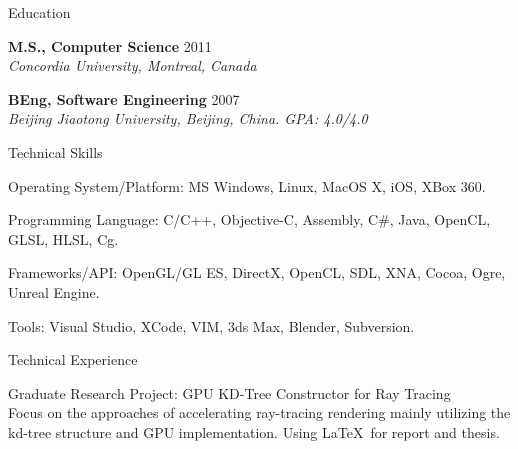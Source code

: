 \documentclass[10pt]{article}
\newenvironment{mydescription}{%
    \begin{description}
        \setlength{\itemsep}{0.25em}%
        \setlength{\parsep}{0em}%
        \setlength{\topsep}{\itemsep}%
        \setlength{\parskip}{0em}%
        \setlength{\labelwidth}{0.1em}
        \setlength{\labelsep}{0em} 
    }%
{\end{description}}
\begin{document}
\begin{cv}
\begin{cvlist}{Education}
    
    \item   \textbf{M.S., Computer Science} \hfill 2011 \\ 
            \emph{Concordia University, Montreal, Canada}
    \item   \textbf{BEng, Software Engineering} \hfill 2007 \\
            \emph{Beijing Jiaotong University, Beijing, China. GPA: 4.0/4.0}
\end{cvlist}

\begin{cvlist}{Technical Skills}
\item
    \begin{mydescription} 
        \item Operating System/Platform: \hspace{0.1em} 
            MS Windows, Linux, MacOS X, iOS, XBox 360.
        \item Programming Language: \hspace{0.1em} 
            C/C++, Objective-C, Assembly, C\#, Java, OpenCL, GLSL, HLSL, Cg.
        \item Frameworks/API: \hspace{0.1em} 
            OpenGL/GL ES, DirectX, OpenCL, SDL, XNA, Cocoa, Ogre, Unreal Engine.  
        \item Tools: \hspace{0.1em} 
            Visual Studio, XCode, VIM, 3ds Max, Blender, Subversion.
    \end{mydescription} 
\end{cvlist} 


\begin{cvlist}{Technical Experience}
\item
    \begin{mydescription}
        \item[Graduate Research Project: GPU KD-Tree Constructor for Ray Tracing] \hfill \\
            Focus on the approaches of accelerating ray-tracing rendering mainly utilizing the kd-tree structure and GPU implementation. Using \LaTeX\ for report and thesis.    


\end{mydescription}
\end{cvlist}
\end{cv}
\end{document}
